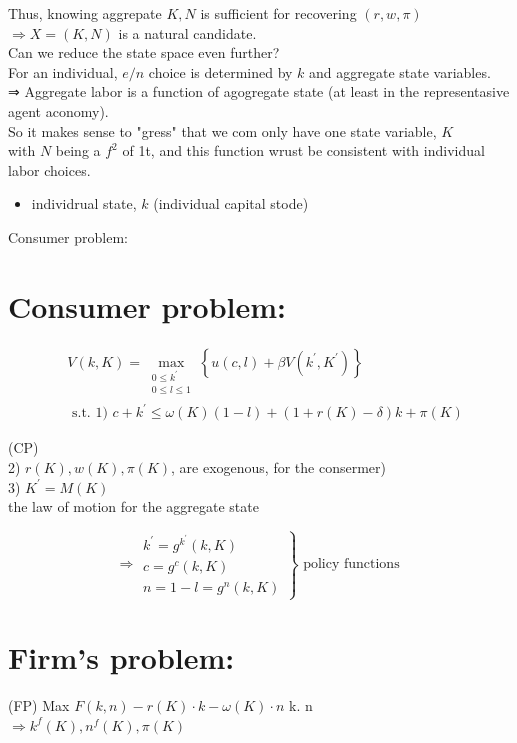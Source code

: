 \documentclass[10pt]{article}
\begin{document}
Thus, knowing aggrepate $K, N$ is sufficient for recovering $(r, w, \pi)$\\
$\Rightarrow X=(K, N)$ is a natural candidate.\\
Can we reduce the state space even further?\\
For an individual, $e / n$ choice is determined by $k$ and aggregate state variables.\\
⇒ Aggregate labor is a function of agogregate state (at least in the representasive agent aconomy).\\
So it makes sense to "gress" that we com only have one state variable, $K$\\
with $N$ being a $f^{2}$ of 1t, and this function wrust be consistent with individual labor choices.

\begin{itemize}
  \item individrual state, $k$ (individual capital stode)
\end{itemize}

Consumer problem:

\section*{Consumer problem:}
$$
\begin{aligned}
& V(k, K)=\max _{\substack{0 \leq k^{\prime} \\
0 \leq l \leq 1}}\left\{u(c, l)+\beta V\left(k^{\prime}, K^{\prime}\right)\right\} \\
& \text { s.t. 1) } c+k^{\prime} \leq \omega(K)(1-l)+(1+r(K)-\delta) k+\pi(K)
\end{aligned}
$$

(CP)\\
2) $r(K), w(K), \pi(K)$, are exogenous, for the consermer)\\
3) $K^{\prime}=M(K)$\\
the law of motion for the aggregate state

$$
\left.\Rightarrow \begin{array}{l}
k^{\prime}=g^{k^{\prime}}(k, K) \\
c=g^{c}(k, K) \\
n=1-l=g^{n}(k, K)
\end{array}\right\} \text { policy functions }
$$

\section*{Firm's problem:}
(FP) Max $F(k, n)-r(K) \cdot k-\omega(K) \cdot n$ k. n\\
$\Rightarrow k^{f}(K), n^{f}(K), \pi(K)$
\end{document}
